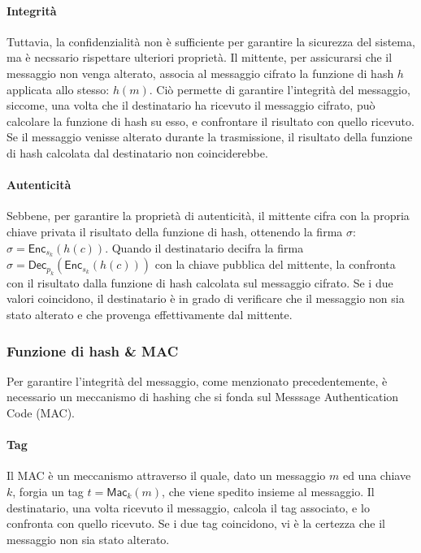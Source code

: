 \documentclass[a4paper,12pt]{article}
\begin{document}
\paragraph{Integrità}
Tuttavia, la confidenzialità non è sufficiente per garantire la sicurezza del sistema, ma è necssario rispettare ulteriori proprietà.
Il mittente, per assicurarsi che il messaggio non venga alterato, associa al messaggio cifrato la funzione di hash $h$ applicata allo stesso: $h(m)$. Ciò permette di garantire l'integrità del messaggio, siccome, una volta che il destinatario ha ricevuto il messaggio cifrato, può calcolare la funzione di hash su esso, e confrontare il risultato con quello ricevuto. Se il messaggio venisse alterato durante la trasmissione, il risultato della funzione di hash calcolata dal destinatario non coinciderebbe.
\paragraph{Autenticità}
Sebbene, per garantire la proprietà di autenticità, il mittente cifra con la propria chiave privata il risultato della funzione di hash, ottenendo la firma $\sigma$: $\sigma=\mathsf{Enc}_{s_k}(h(c))$. Quando il destinatario decifra la firma $\sigma=\mathsf{Dec}_{p_k}\left(\mathsf{Enc}_{s_k}\left(h\left(c\right)\right)\right)$ con la chiave pubblica del mittente, la confronta con il risultato dalla funzione di hash calcolata sul messaggio cifrato. Se i due valori coincidono, il destinatario è in grado di verificare che il messaggio non sia stato alterato e che provenga effettivamente dal mittente.
\subsubsection{Funzione di hash \& MAC}
Per garantire l'integrità del messaggio, come menzionato precedentemente, è necessario un meccanismo di hashing che si fonda sul Messsage Authentication Code (MAC).
\paragraph{Tag}
Il MAC è un meccanismo attraverso il quale, dato un messaggio $m$ ed una chiave $k$, forgia un tag $t=\mathsf{Mac}_k(m)$, che viene spedito insieme al messaggio. Il destinatario, una volta ricevuto il messaggio, calcola il tag associato, e lo confronta con quello ricevuto. Se i due tag coincidono, vi è la certezza che il messaggio non sia stato alterato.
\end{document}

